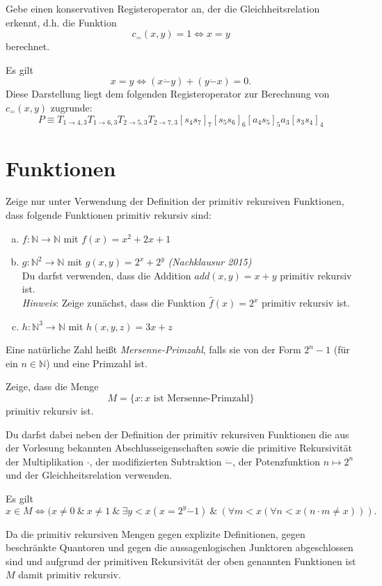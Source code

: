 \documentclass[german,headsepline]{scrartcl}
\theoremstyle{definition}
\begin{document}
	\begin{question}[subtitle={Nachklausur 2015}]
		Gebe einen konservativen Registeroperator an,
		der die Gleichheitsrelation erkennt, d.h. die Funktion
		\[c_=(x,y)=1\Leftrightarrow x=y\]
		berechnet.
	\end{question}
	\begin{solution}
		Es gilt
		\[x=y\Leftrightarrow (x\dot{-}y)+(y\dot{-}x)=0.\]
		Diese Darstellung liegt dem folgenden Registeroperator zur Berechnung von $c_=(x,y)$ zugrunde:
		\[P\equiv T_{1\to4,3}T_{1\to6,3}T_{2\to5,3}T_{2\to7,3}[s_4s_7]_7[s_5s_6]_6[a_4s_5]_5a_3[s_3s_4]_4\]
	\end{solution}
	
	\section{Funktionen}
	\begin{question}
		Zeige nur unter Verwendung der Definition der primitiv rekursiven Funktionen,
		dass folgende Funktionen primitiv rekursiv sind:
		\begin{enumerate}[(a)]
			\item $f:\mathbb{N}\to\mathbb{N}$ mit $f(x)=x^2+2x+1$
			\item $g:\mathbb{N}^2\to\mathbb{N}$ mit $g(x,y)=2^x+2^y$
				\hfill\textit{(Nachklausur 2015)} \\
				Du darfst verwenden, dass die Addition $add(x,y)=x+y$ primitiv rekursiv ist. \\
				\textit{Hinweis}: Zeige zunächst, dass die Funktion $\hat{f}(x)=2^x$ primitiv rekursiv ist.
			\item $h:\mathbb{N}^3\to\mathbb{N}$ mit $h(x,y,z)=3x+z$
		\end{enumerate}
	\end{question}
	
	\begin{question}[subtitle={Nachklausur 2013}]
		Eine natürliche Zahl heißt \emph{Mersenne-Primzahl}, falls sie von der Form $2^n-1$ (für ein $n\in\mathbb{N}$) und eine Primzahl ist.
		
		Zeige, dass die Menge
		\[M=\{x\colon x\text{ ist Mersenne-Primzahl}\}\]
		primitiv rekursiv ist.
		
		Du darfst dabei neben der Definition der primitiv rekursiven Funktionen die aus der Vorlesung bekannten Abschlusseigenschaften sowie die primitive Rekursivität der Multiplikation $\cdot$, der modifizierten Subtraktion $\dot{-}$, der Potenzfunktion $n\mapsto2^n$ und der Gleichheitsrelation verwenden.
	\end{question}
	\begin{solution}
		Es gilt
		\[x\in M\Leftrightarrow(x\neq0~\&~x\neq1~\&~\exists y<x(x=2^y\dot{-}1)~\&~(\forall m<x(\forall n<x(n\cdot m\neq x))).\]
		
		Da die primitiv rekursiven Mengen gegen explizite Definitionen,
		gegen beschränkte Quantoren und gegen die aussagenlogischen Junktoren abgeschlossen sind
		und aufgrund der primitiven Rekursivität der oben genannten Funktionen
		ist $M$ damit primitiv rekursiv.
	\end{solution}
	
\end{document}
